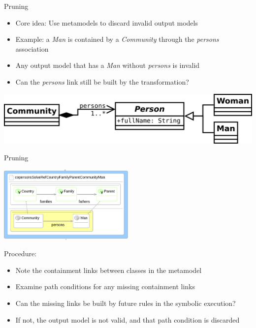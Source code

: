 \documentclass[12pt, handout]{beamer}
\begin{document}
\begin{frame}{Pruning}

\begin{itemize}
\item Core idea: Use metamodels to discard invalid output models
\item Example: a \textit{Man} is contained by a \textit{Community} through the \textit{persons} association
\item Any output model that has a \textit{Man} without \textit{persons} is invalid
\item Can the \textit{persons} link still be built by the transformation?
\end{itemize}
\begin{center}
\includegraphics[width=\textwidth]{figures/PersonsMM}
\end{center}


\end{frame}

\begin{frame}{Pruning}
\begin{center}
\includegraphics[width=0.5\textwidth]{figures/copersonsMan}
\end{center}
Procedure:
\begin{itemize}
\item Note the containment links between classes in the metamodel
\item Examine path conditions for any missing containment links
\item Can the missing links be built by future rules in the symbolic execution? 
\item If not, the output model is not valid, and that path condition is discarded
\end{itemize}


\end{frame}
\end{document}
